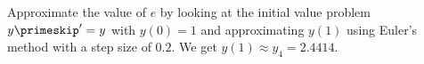 {Approximate the value of $e$ by looking at the initial value problem
$y\primeskip'=y$ with $y(0)=1$ and approximating $y(1)$ using Euler's method with
a step size of $0.2$.}
{We get $y(1)\approx y_4 = 2.4414$.}
